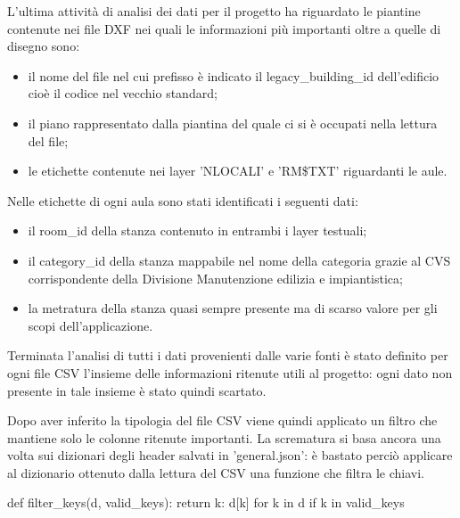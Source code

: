\documentclass[12pt]{report}
\begin{document}
\vspace{5mm} %

L'ultima attività di analisi dei dati per il progetto ha riguardato le piantine contenute nei file DXF nei quali le informazioni più importanti oltre a quelle di disegno sono:
\begin{itemize}
\item il nome del file nel cui prefisso è indicato il legacy\_building\_id dell'edificio cioè il codice nel vecchio standard;
\item il piano rappresentato dalla piantina del quale ci si è occupati nella lettura del file;
\item le etichette contenute nei layer 'NLOCALI' e 'RM\$TXT' riguardanti le aule.
\end{itemize}  

\newpage

Nelle etichette di ogni aula sono stati identificati i seguenti dati:
\begin{itemize}
\item il room\_id della stanza contenuto in entrambi i layer testuali;
\item il category\_id della stanza mappabile nel nome della categoria grazie al CVS corrispondente della Divisione Manutenzione edilizia e impiantistica;
\item la metratura della stanza quasi sempre presente ma di scarso valore per gli scopi dell'applicazione.
\end{itemize}  

\vspace{5mm} %

Terminata l'analisi di tutti i dati provenienti dalle varie fonti è stato definito per ogni file CSV l'insieme delle informazioni ritenute utili al progetto: ogni dato non presente in tale insieme è stato quindi scartato.

Dopo aver inferito la tipologia del file CSV viene quindi applicato un filtro che mantiene solo le colonne ritenute importanti. 
La scrematura si basa ancora una volta sui dizionari degli header salvati in 'general.json': è bastato perciò applicare al dizionario ottenuto dalla lettura del CSV una funzione che filtra le chiavi.
\begin{python}[title=Definizione della funzione filter\_keys, frame=single]
def filter_keys(d, valid_keys):
   return { k: d[k] for k in d if k in valid_keys }
\end{python}
\vspace{5mm} %
\end{document}
